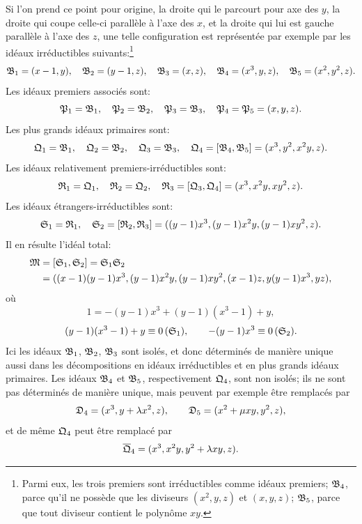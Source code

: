 Si l'on prend ce point pour origine, la droite qui le parcourt pour axe des $y$, la droite qui coupe celle-ci parallèle à l'axe des $x$, et la droite qui lui est gauche parallèle à l'axe des $z$, une telle configuration est représentée par exemple par les idéaux irréductibles suivants:\footnote{Parmi eux, les trois premiers sont irréductibles comme idéaux premiers; $\mathfrak{B}_4$, parce qu'il ne possède que les diviseurs $(x^2,y,z)$ et $(x,y,z)$; $\mathfrak{B}_5$, parce que tout diviseur contient le polynôme $xy$.}
\[
\begin{gathered}
 \mathfrak{B}_1=(x-1,y),\quad
 \mathfrak{B}_2=(y-1,z),\quad
 \mathfrak{B}_3=(x,z),\quad
 \mathfrak{B}_4=(x^3,y,z),\quad
 \mathfrak{B}_5=(x^2,y^2,z).
\end{gathered}
\]
Les idéaux premiers associés sont:
\[
 \mathfrak{P}_1=\mathfrak{B}_1,
 \quad \mathfrak{P}_2=\mathfrak{B}_2,
 \quad \mathfrak{P}_3=\mathfrak{B}_3,
 \quad \mathfrak{P}_4=\mathfrak{P}_5=(x,y,z).
\]
Les plus grands idéaux primaires sont:
\[
 \mathfrak{Q}_1=\mathfrak{B}_1,
 \quad \mathfrak{Q}_2=\mathfrak{B}_2,
 \quad \mathfrak{Q}_3=\mathfrak{B}_3,
 \quad \mathfrak{Q}_4=[\mathfrak{B}_4,\mathfrak{B}_5]=(x^3,y^2,x^2y,z).
\]
Les idéaux relativement premiers-irréductibles sont:
\[
 \mathfrak{R}_1=\mathfrak{Q}_1,
 \quad \mathfrak{R}_2=\mathfrak{Q}_2,
 \quad \mathfrak{R}_3=[\mathfrak{Q}_3,\mathfrak{Q}_4]=(x^3,x^2y,xy^2,z).
\]
Les idéaux étrangers-irréductibles sont:
\[
 \mathfrak{S}_1=\mathfrak{R}_1,
 \quad
 \mathfrak{S}_2=[\mathfrak{R}_2,\mathfrak{R}_3]=((y-1)x^3,(y-1)x^2y,(y-1)xy^2,z).
\]
Il en résulte l'idéal total:
\[
\begin{aligned}
 \mathfrak{M}&=[\mathfrak{S}_1,\mathfrak{S}_2]=\mathfrak{S}_1\mathfrak{S}_2 \\
 &=((x-1)(y-1)x^3,(y-1)x^2y,(y-1)xy^2,(x-1)z,y(y-1)x^3,yz),
\end{aligned}
\]
où
\[
 1=-(y-1)x^3+(y-1)(x^3-1)+y,
\]
\[
 (y-1)(x^3-1)+y\equiv 0\,(\mathfrak{S}_1),
 \qquad -(y-1)x^3\equiv 0\,(\mathfrak{S}_2).
\]
Ici les idéaux $\mathfrak{B}_1$, $\mathfrak{B}_2$, $\mathfrak{B}_3$ sont isolés, et donc déterminés de manière unique aussi dans les décompositions en idéaux irréductibles et en plus grands idéaux primaires. Les idéaux $\mathfrak{B}_4$ et $\mathfrak{B}_5$, respectivement $\mathfrak{Q}_4$, sont non isolés; ils ne sont pas déterminés de manière unique, mais peuvent par exemple être remplacés par
\[
 \mathfrak{D}_4=(x^3,y+\lambda x^2,z),
 \qquad
 \mathfrak{D}_5=(x^2+\mu xy,y^2,z),
\]
et de même $\mathfrak{Q}_4$ peut être remplacé par
\[
 \overline{\mathfrak{Q}}_4=(x^3,x^2y,y^2+\lambda xy,z).
\]

